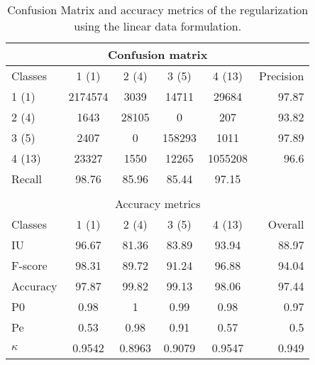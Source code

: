 \begin{table}[H]
\begin{center}
\footnotesize
\begin{tabular}{|l|c|c|c|c|r|}
\hline
\multicolumn{6}{|c|}{Confusion matrix} \\
\hline
 Classes & 1 (1) & 2 (4) & 3 (5) & 4 (13) & Precision \\
\hline
1 (1) & 2174574 & 3039 & 14711 & 29684 & 97.87 \\
\hline
2 (4) & 1643 & 28105 & 0 & 207 & 93.82 \\
\hline
3 (5) & 2407 & 0 & 158293 & 1011 & 97.89 \\
\hline
4 (13) & 23327 & 1550 & 12265 & 1055208 & 96.6 \\
\hline
Recall & 98.76 & 85.96 & 85.44 & 97.15 &  \\
\hline
\multicolumn{6}{c}{ } \\
\hline
\multicolumn{6}{|c|}{Accuracy metrics} \\
\hline
 Classes & 1 (1) & 2 (4) & 3 (5) & 4 (13) & Overall \\
\hline
IU & 96.67 & 81.36 & 83.89 & 93.94 & 88.97 \\
\hline
F-score & 98.31 & 89.72 & 91.24 & 96.88 & 94.04 \\
\hline
Accuracy & 97.87 & 99.82 & 99.13 & 98.06 & 97.44 \\
\hline
P0 & 0.98 & 1 & 0.99 & 0.98 & 0.97 \\
\hline
Pe & 0.53 & 0.98 & 0.91 & 0.57 & 0.5 \\
\hline
$\kappa$ & 0.9542 & 0.8963 & 0.9079 & 0.9547 & 0.949 \\
\hline
\end{tabular}
\caption{Confusion Matrix and accuracy metrics of the regularization  using the linear data formulation.}
\label{table:}
\end{center}
\end{table}
